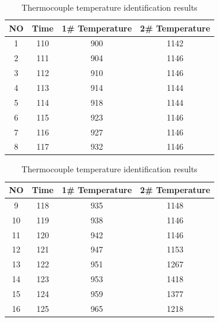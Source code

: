 \documentclass{apmcmthesis}
\begin{document}
	\begin{table}[htbp!]
		\centering
		\small
		\caption{Thermocouple temperature identification results}
			\begin{minipage}{0.49\linewidth}
				\begin{tabular}{@{}cccc@{}}
				\toprule
				\textbf{NO} & \textbf{Time} & \textbf{1\# Temperature} & \textbf{2\# Temperature} \\ \midrule
				1           & 110           & 900                      & 1142                     \\
				2           & 111           & 904                      & 1146                     \\
				3           & 112           & 910                      & 1146                     \\
				4           & 113           & 914                      & 1144                     \\
				5           & 114           & 918                      & 1144                     \\
				6           & 115           & 923                      & 1146                     \\
				7           & 116           & 927                      & 1146                     \\
				8           & 117           & 932                      & 1146                     \\ \bottomrule
			\end{tabular}
		\end{minipage}
		\begin{minipage}{0.49\linewidth}
		\begin{tabular}{@{}cccc@{}}
			\toprule
			\textbf{NO} & \textbf{Time} & \textbf{1\# Temperature} & \textbf{2\# Temperature} \\ \midrule
			9           & 118           & 935                      & 1148                     \\
			10          & 119           & 938                      & 1146                     \\
			11          & 120           & 942                      & 1146                     \\
			12          & 121           & 947                      & 1153                     \\
			13          & 122           & 951                      & 1267                     \\
			14          & 123           & 953                      & 1418                     \\
			15          & 124           & 959                      & 1377                     \\
			16          & 125           & 965                      & 1218                     \\ \bottomrule
		\end{tabular}
		\end{minipage}
	\end{table}
\end{document}
